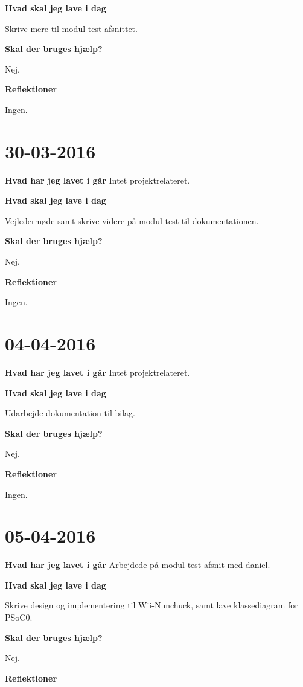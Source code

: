 \documentclass{article}
\begin{document}
	\textbf{Hvad skal jeg lave i dag}
	
	Skrive mere til modul test afsnittet.
	
	\textbf{Skal der bruges hjælp?}
	
	Nej.
	
	\textbf{Reflektioner}
	
	Ingen.
	
	\section{30-03-2016}
	
	\textbf{Hvad har jeg lavet i går}
	Intet projektrelateret.
	
	\textbf{Hvad skal jeg lave i dag}
	
	Vejledermøde samt skrive videre på modul test til dokumentationen.
	
	\textbf{Skal der bruges hjælp?}
	
	Nej.
	
	\textbf{Reflektioner}
	
	Ingen.
	
	\section{04-04-2016}
	
	\textbf{Hvad har jeg lavet i går}
	Intet projektrelateret.
	
	\textbf{Hvad skal jeg lave i dag}
	
	Udarbejde dokumentation til bilag.
	
	\textbf{Skal der bruges hjælp?}
	
	Nej.
	
	\textbf{Reflektioner}
	
	Ingen.
	
	\section{05-04-2016}
	
	\textbf{Hvad har jeg lavet i går}
	Arbejdede på modul test afsnit med daniel.
	
	\textbf{Hvad skal jeg lave i dag}
	
	Skrive design og implementering til Wii-Nunchuck, samt lave klassediagram for PSoC0.
	
	\textbf{Skal der bruges hjælp?}
	
	Nej.
	
	\textbf{Reflektioner}
	
\end{document}
